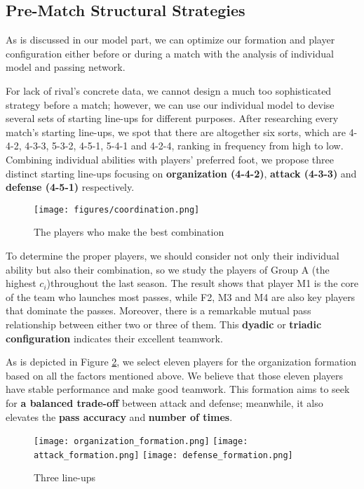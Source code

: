 \documentclass{mcmthesis}
\begin{document}
\subsection{Pre-Match Structural Strategies}\label{Structual Strategy}
As is discussed in our model part, we can optimize our formation and player configuration either before or during a match with the analysis of individual model and passing network.

For lack of rival's concrete data, we cannot design a much too sophisticated strategy before a match; however, we can use our individual model to devise several sets of starting line-ups for different purposes. After researching every match's starting line-ups, we spot that there are altogether six sorts, which are 4-4-2, 4-3-3, 5-3-2, 4-5-1, 5-4-1 and 4-2-4, ranking in frequency from high to low. Combining individual abilities with players' preferred foot, we propose three distinct starting line-ups focusing on \textbf{organization (4-4-2)}, \textbf{attack (4-3-3)} and \textbf{defense (4-5-1)} respectively.
\begin{figure}[htbp]
  \centering
  \texttt{[image: figures/coordination.png]}
  \caption{The players who make the best combination}\label{best}
\end{figure}

To determine the proper players, we should consider not only their individual ability but also their combination, so we study the players of Group A (the highest $c_{i}$)throughout the last season. The result shows that player M1 is the core of the team who launches most passes, while F2, M3 and M4 are also key players that dominate the passes. Moreover, there is a remarkable mutual pass relationship between either two or three of them. This \textbf{dyadic} or \textbf{triadic configuration} indicates their excellent teamwork.

As is depicted in Figure \ref{line-up}, we select eleven players for the organization formation based on all the factors mentioned above. We believe that those eleven players have stable performance and  make good teamwork. This formation aims to seek for \textbf{a balanced trade-off} between attack and defense; meanwhile, it also elevates the \textbf{pass accuracy} and \textbf{number of times}.

\begin{figure}[htbp]\centering
\texttt{[image: organization\_formation.png]}
\texttt{[image: attack\_formation.png]}
\texttt{[image: defense\_formation.png]}
\caption{Three line-ups}\label{line-up}
\end{figure}
\end{document}

